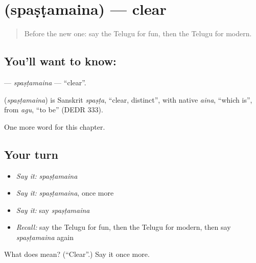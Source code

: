 \section[\texorpdfstring{\te{స్పష్టమైన} (spaṣṭamaina)}{స్పష్టమైన (spaṣṭamaina)}]{ (spaṣṭamaina) — clear}

\label{lesson:TE-C222-spastamaina}



\begin{quote}
Before the new one: say the Telugu for fun, then the Telugu for modern.
\end{quote}

\subsection*{You'll want to know: }
\textbf{} — \emph{spaṣṭamaina} — \textquotedblleft{}clear\textquotedblright{}.

\begin{cousinweb}
\textbf{} (\emph{spaṣṭamaina}) is Sanskrit \emph{spaṣṭa}, \textquotedblleft{}clear, distinct\textquotedblright{}, with native \emph{aina}, \textquotedblleft{}which is\textquotedblright{}, from \emph{agu}, \textquotedblleft{}to be\textquotedblright{} (DEDR 333).
\end{cousinweb}

\begin{grammarlens}[title={What you've built}]
One more word for this chapter.
\end{grammarlens}

\subsection*{Your turn}
\begin{itemize}
\raggedright
  \item \emph{Say it:} \emph{spaṣṭamaina}
  \item \emph{Say it:} \emph{spaṣṭamaina}, once more
  \item \emph{Say it:} say \emph{spaṣṭamaina}
  \item \emph{Recall:} say the Telugu for fun, then the Telugu for modern, then say \emph{spaṣṭamaina} again
\end{itemize}

\begin{tcolorbox}[breakable,colback=teal!4,colframe=teal!35!black,title={Before you move on}]
What does  mean? (\textquotedblleft{}Clear\textquotedblright{}.) Say it once more.
\end{tcolorbox}
